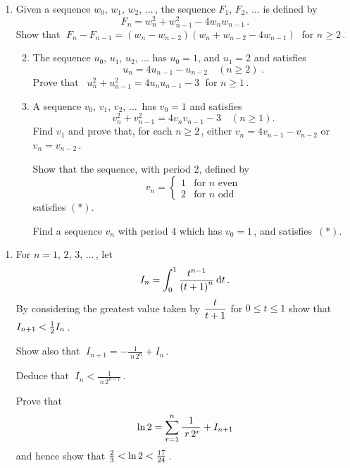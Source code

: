 \documentclass[a4, 11pt]{report}
\newlength{\qspace}
\newcounter{qnumber}
\newenvironment{question}%
 {\vspace{\qspace}
  \begin{enumerate}[\bfseries 1\quad][10]%
    \setcounter{enumi}{\value{qnumber}}%
    \item%
 }
{
  \end{enumerate}
  \filbreak
  \stepcounter{qnumber}
 }
\newenvironment{questionparts}[1][1]%
 {
  \begin{enumerate}[\bfseries (i)]%
    \setcounter{enumii}{#1}
    \addtocounter{enumii}{-1}
    \setlength{\itemsep}{5mm}
    \setlength{\parskip}{8pt}
 }
 {
  \end{enumerate}
 }
\def\le{\leqslant}
\def\ge{\geqslant}
\newcommand{\ds}{\displaystyle}
\def\l{\left(}
\def\r{\right)}
\begin{document}
\begin{question}
Given a sequence $w_0$, $w_1$, $w_2$, $\ldots\,$, the sequence $F_1$, $F_2$, $\ldots$ is
defined by
 $$F_n = w_n^2 + w_{n-1}^2 - 4w_nw_{n-1} \,.$$
Show that
$\;
F_{n}-F_{n-1} = \l w_n-w_{n-2} \r \l w_n+w_{n-2}-4w_{n-1} \r \; 
$ for $n \ge 2\,$.

\begin{questionparts}
\item
The sequence $u_0$, $u_1$, $u_2$, $\ldots$ 
 has $u_0 = 1$, and $u_1 = 2$ and satisfies 
\[
u_n = 4u_{n-1} -u_{n-2} \quad (n \ge 2)\;.
\]
Prove  that
\ $
u_n^2 + u_{n-1}^2 = 4u_nu_{n-1}-3
\; $
for  $n \ge 1\,$.

\item
A sequence $v_0$, $v_1$, $v_2$, $\ldots\,$ has $v_0=1$ and satisfies
\begin{equation*}
v_n^2 + v_{n-1}^2 = 4v_nv_{n-1}-3   \quad (n \ge 1).  \tag{$\ast$}
\end{equation*}
Find $v_1$ and  prove that,  for each $n\ge2\,$, either 
$v_n= 4v_{n-1} -v_{n-2}$ or $v_n=v_{n-2}\,$.
 
Show that the sequence, with period 2,  defined  by
\begin{equation*}
v_n = 
\begin{cases}
1 & \mbox{for $n$ even} \\  
2 &  \mbox{for $n$   odd}
\end{cases}
\end{equation*}
\makebox[7mm]{\hfill}satisfies $(\ast)$.

Find a sequence $v_n$ with period 4 
which has $v_0=1\,$,  and satisfies~$(\ast)$.
\end{questionparts} 
\end{question}
	
\begin{question}
For $n=1$, $2$, $3$, $\ldots\,$, let
\[
I_n = \int_0^1 {t^{n-1} \over \l t+1 \r^n} \, \mathrm{d} t \, .
\]
By considering the greatest value taken by 
$\ds {t \over t+1}$ for $0 \le t \le 1$ 
show that 
$I_{n+1} < {1 \over 2} I_{n}\,$.

Show also that 
$\; \ds I_{n+1}= - \frac 1{\; n\,  2^n}   + I_{n}\,$.

Deduce that 
$\; \ds I_n < \frac1 {\; n \, 2^{n-1}}\,$.

Prove that
\[
\ln 2 = \sum_{r=1}^n {1 \over \; r\, 2^r} + I_{n+1}
\]
and hence show that \hspace{2 pt} ${2 \over 3} < \ln 2 < {17 \over 24}\,$.
\end{question}
		
\end{document}
